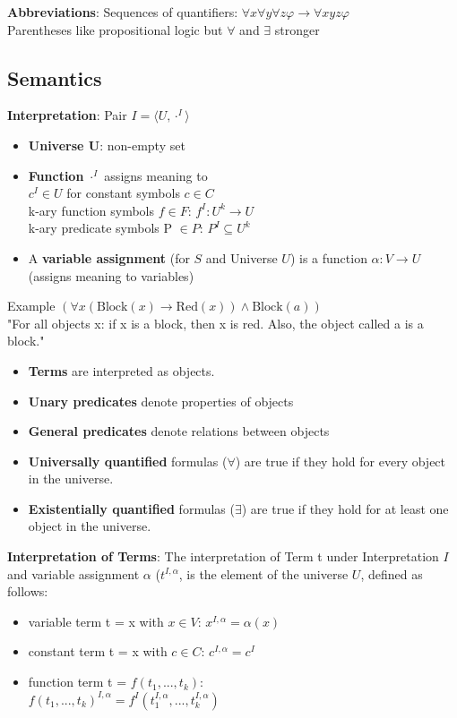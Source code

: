 \textbf{Abbreviations}: Sequences of quantifiers: $\forall x \forall y \forall z \varphi \rightarrow \forall xyz \varphi$ \\
Parentheses like propositional logic but $\forall$ and $\exists$ stronger
\subsection*{Semantics}
\textbf{Interpretation}: Pair $I = \langle U, \cdot^I\rangle$ 
\begin{itemize}[noitemsep,topsep=0pt,leftmargin=*]
    \item \textbf{Universe U}: non-empty set 
    \item \textbf{Function} $\cdot^I$ assigns meaning to \\
    $c^I \in U$ for constant symbols $c \in C$ \\
    k-ary function symbols $f\in F$: $f^I : U^k \rightarrow U$ \\
    k-ary predicate symbols P $\in P$: $P^I \subseteq U^k$
    \item A\textbf{ variable assignment} (for $S$ and Universe $U$)  is a function $\alpha: V \rightarrow U$ (assigns meaning to variables)
\end{itemize}
Example $(\forall x(\text{Block}(x) \rightarrow \text{Red}(x)) \wedge \text{Block}(a))$ \\
"For all objects x: if x is a block, then x is red. Also, the object called a is a block." \\
\begin{itemize}[noitemsep,topsep=0pt,leftmargin=*]
    \item \textbf{Terms} are interpreted as objects.
    \item \textbf{Unary predicates} denote properties of objects
    \item \textbf{General predicates} denote relations between objects
    \item \textbf{Universally quantified} formulas ($\forall$) are true if they hold for every object in the universe. 
    \item \textbf{Existentially quantified} formulas ($\exists$) are true if they hold for at least one object in the universe.
\end{itemize}
\textbf{Interpretation of Terms}: The interpretation of Term t under Interpretation $I$ and variable assignment $\alpha$ ($t^{I, \alpha}$, is the element of the universe $U$, defined as follows: 
\begin{itemize}[noitemsep,topsep=0pt,leftmargin=*]
    \item variable term t = x with $x \in V$: $x^{I, \alpha} = \alpha(x)$
    \item constant term t = x with $c \in C$: $c^{I, \alpha} = c^I$
    \item function term t = $f(t_1,...,t_k)$: \\
    \makebox[1cm]{} $f(t_1,...,t_k)^{I, \alpha} = f^I(t_{1}^{I, \alpha},...,t_{k}^{I, \alpha})$
\end{itemize}
